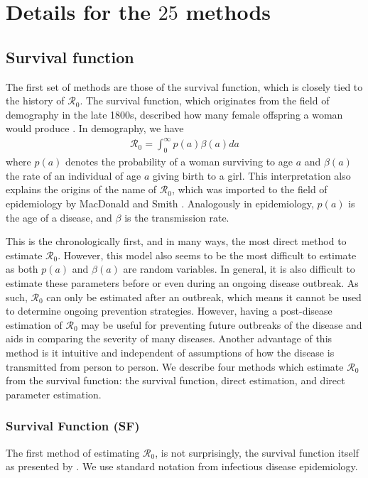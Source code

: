 \documentclass[12pt]{article}
\newcommand{\XX}{\ensuremath{25}} %
\newcommand{\rr}{\ensuremath{\mathcal{R}_0}}
\begin{document}
\section{Details for the $\XX$ methods}
\label{sec:details}
\subsection{Survival function}
\label{sec:direct}

The first set of methods are those of the survival function, which is closely  tied to the history of $\rr$.  The survival function, which originates from the field of demography in the late 1800s, described how many female offspring a woman would produce \citep{dietz1993estimation}.  In demography, we have
\begin{align*}
\rr = \int_0^\infty p(a) \beta(a) da
\end{align*}
where $p(a)$ denotes the probability of a woman surviving to age $a$ and $\beta(a)$ the rate of an individual of age $a$ giving birth to a  girl.   This interpretation also explains the origins of the name of $\rr$, which was imported to the field of epidemiology by MacDonald and Smith \citep{dietz1993estimation}.  Analogously in epidemiology, $p(a)$ is the age of a disease, and $\beta$ is the transmission rate.

This is the chronologically first, and in many ways, the most direct method to estimate $\rr$.  However, this model also seems to be the most difficult to estimate as both $p(a)$ and $\beta (a)$ are random variables.   In general, it is also difficult to estimate these parameters before or even during an ongoing disease outbreak.  As such, $\rr$ can only be estimated after an outbreak, which means it cannot be used to determine ongoing prevention strategies.  However, having a post-disease estimation of $\rr$ may be useful for preventing future outbreaks of the disease and aids in comparing the severity of many diseases.  Another advantage of this method is it intuitive and independent of assumptions of how the disease is transmitted from person to person.    We describe four methods which estimate $\rr$ from the survival function:  the survival function, direct estimation, and direct parameter estimation.


\subsubsection{Survival Function (SF)}
\label{sec:survival_fxn}
The first method of estimating $\rr$, is not surprisingly, the survival function itself as presented by \cite{Heffernan2005}.  We use standard notation from infectious disease epidemiology.
\end{document}
